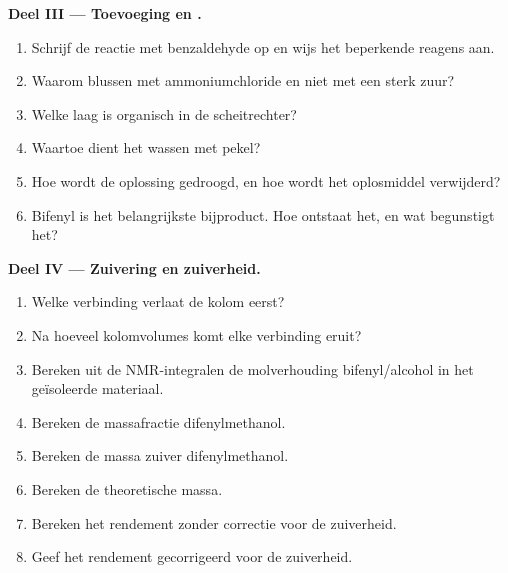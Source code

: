 \begin{problem}
\medskip
\noindent\textbf{Deel III --- Toevoeging en .}
\begin{enumerate}[resume]
  \item Schrijf de reactie met benzaldehyde op en wijs het beperkende reagens aan.
  \item Waarom blussen met ammoniumchloride en niet met een sterk zuur?
  \item Welke laag is organisch in de scheitrechter?
  \item Waartoe dient het wassen met pekel?
  \item Hoe wordt de oplossing gedroogd, en hoe wordt het oplosmiddel verwijderd?
  \item Bifenyl is het belangrijkste bijproduct. Hoe ontstaat het, en wat begunstigt het?
\end{enumerate}

\medskip
\noindent\textbf{Deel IV --- Zuivering en zuiverheid.}
\begin{enumerate}[resume]
  \item Welke verbinding verlaat de kolom eerst?
  \item Na hoeveel kolomvolumes komt elke verbinding eruit?
  \item Bereken uit de NMR-integralen de molverhouding bifenyl/alcohol in het geïsoleerde
        materiaal.
  \item Bereken de massafractie difenylmethanol.
  \item Bereken de massa zuiver difenylmethanol.
  \item Bereken de theoretische massa.
  \item Bereken het rendement zonder correctie voor de zuiverheid.
  \item Geef het rendement gecorrigeerd voor de zuiverheid.
\end{enumerate}
\end{problem}
